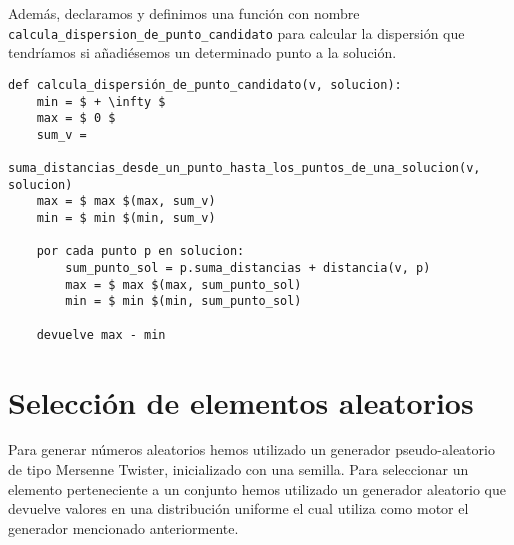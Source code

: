 Además, declaramos y definimos una función con nombre \texttt{calcula\_dispersion\_de\_punto\_candidato} para calcular
la dispersión que tendríamos si añadiésemos un determinado punto a la solución.

\begin{minipage}{\textwidth}
\begin{lstlisting}[mathescape=true,caption={Definición de la función que nos permite calcular la dispersión de un punto candidato si perteneciese a una solución.},captionpos=b]
def calcula_dispersión_de_punto_candidato(v, solucion):
    min = $ + \infty $
    max = $ 0 $
    sum_v =
        suma_distancias_desde_un_punto_hasta_los_puntos_de_una_solucion(v, solucion)
    max = $ max $(max, sum_v)
    min = $ min $(min, sum_v)

    por cada punto p en solucion:
        sum_punto_sol = p.suma_distancias + distancia(v, p)
        max = $ max $(max, sum_punto_sol)
        min = $ min $(min, sum_punto_sol)
    
    devuelve max - min
\end{lstlisting}
\end{minipage}

\section{Selección de elementos aleatorios}

Para generar números aleatorios hemos utilizado un generador pseudo-aleatorio de tipo Mersenne Twister, inicializado con una semilla.
Para seleccionar un elemento perteneciente a un conjunto hemos utilizado un generador aleatorio que devuelve valores en una distribución uniforme
el cual utiliza como motor el generador mencionado anteriormente.